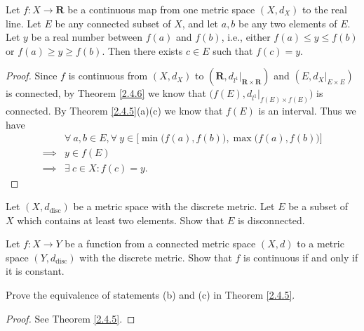 \begin{corollary}\label{2.4.7}
    Let \(f : X \to \mathbf{R}\) be a continuous map from one metric space \((X, d_X)\) to the real line.
    Let \(E\) be any connected subset of \(X\), and let \(a, b\) be any two elements of \(E\).
    Let \(y\) be a real number between \(f(a)\) and \(f(b)\), i.e., either \(f(a) \leq y \leq f(b)\) or \(f(a) \geq y \geq f(b)\).
    Then there exists \(c \in E\) such that \(f(c) = y\).
\end{corollary}

\begin{proof}
    Since \(f\) is continuous from \((X, d_X)\) to \((\mathbf{R}, d_{l^1}|_{\mathbf{R} \times \mathbf{R}})\) and \((E, d_X|_{E \times E})\) is connected, by Theorem \ref{2.4.6} we know that \(\big(f(E), d_{l^1}|_{f(E) \times f(E)}\big)\) is connected.
    By Theorem \ref{2.4.5}(a)(c) we know that \(f(E)\) is an interval.
    Thus we have
    \begin{align*}
                 & \forall\ a, b \in E, \forall\ y \in \Big[\min\big(f(a), f(b)\big), \max\big(f(a), f(b)\big)\Big] \\
        \implies & y \in f(E)                                                                                       \\
        \implies & \exists\ c \in X : f(c) = y.
    \end{align*}
\end{proof}

\exercisesection

\begin{exercise}\label{ex 2.4.1}
    Let \((X, d_{\text{disc}})\) be a metric space with the discrete metric.
    Let \(E\) be a subset of \(X\) which contains at least two elements.
    Show that \(E\) is disconnected.
\end{exercise}

\begin{exercise}\label{ex 2.4.2}
    Let \(f : X \to Y\) be a function from a connected metric space \((X, d)\) to a metric space \((Y, d_{\text{disc}})\) with the discrete metric.
    Show that \(f\) is continuous if and only if it is constant.
\end{exercise}

\begin{exercise}\label{ex 2.4.3}
    Prove the equivalence of statements (b) and (c) in Theorem \ref{2.4.5}.
\end{exercise}

\begin{proof}
    See Theorem \ref{2.4.5}.
\end{proof}

